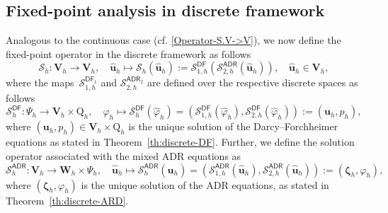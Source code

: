 \documentclass[11pt, reqno, a4paper, twoside]{article}
\newcommand{\bu}{\boldsymbol{u}}
\newcommand\bzeta{\boldsymbol{\zeta}}
\newcommand{\rQ}{\mathrm{Q}}
\newcommand{\bW}{\mathbf{W}}
\newcommand{\bV}{\mathbf{V}}
\newcommand{\cS}{\mathcal{S}}
\numberwithin{equation}{section}
\numberwithin{remark}{section}
\numberwithin{figure}{section}
\numberwithin{table}{section}
\begin{document}
{\subsection{Fixed-point analysis in discrete framework}
{Analogous to the continuous case (cf. \eqref{Operator-S.V->V}), we now define the fixed-point operator in the discrete framework as follows  
\begin{equation}\label{Operator-S_h.Vh->Vh}
\cS_h: \bV_h  \to  \bV_h, \quad \hat{\bu}_h \mapsto \cS_h(\hat{\bu}_h):= \cS_{1,h}^{\mathsf{DF}}(\cS_{2,h}^{\mathsf{ADR}}(\hat{\bu}_h)),\quad \hat{\bu}_h\in\bV_h,
\end{equation}
where the maps~\(\cS_{1,h}^{\mathsf{DF}_1}\) and \( \cS_{2,h}^{\mathsf{ADR}_2}\) are defined over the respective discrete spaces as follows
\[ \cS_h^{\mathsf{DF}}:\Psi_h\to \bV_h \times \rQ_h, \quad \hat{\varphi}_h \mapsto \cS_h^{\mathsf{DF}}(\hat{\varphi}_h)= (\cS^{\mathsf{DF}}_{1,h}(\hat{\varphi}_h), \cS^{\mathsf{DF}}_{2,h}(\hat{\varphi}_h)):= (\bu_h, p_h), \]
where $( \bu_h,p_h) \in \bV_h \times \rQ_h$ is the unique solution of the Darcy--Forchheimer equations as stated in Theorem~\ref{th:discrete-DF}.
Further, we define the solution operator associated with the mixed ADR equations as
\[ \cS_h^{\mathsf{ADR}}: \bV_h \to  \bW_h\times \Psi_h, \quad \hat{\bu}_h \mapsto \cS_h^{\mathsf{ADR}}(\hat{\bu}_h)=(\cS^{\mathsf{ADR}}_{1,h}(\hat{\bu}_h),\cS^{\mathsf{ADR}}_{2,h}(\hat{\bu}_h)):= ( \bzeta_h, \varphi_h),\]
where $(\bzeta_h, \varphi_h)$ is the unique solution of the ADR equations, as stated in Theorem~\ref{th:discrete-ARD}.

}}
\end{document}
